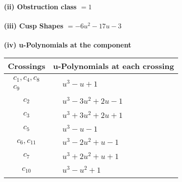 \documentclass[1p]{elsarticle_modified}
\theoremstyle{definition}
\begin{document}
\flushleft \textbf{(ii) Obstruction class $= 1$}\\~\\
\flushleft \textbf{(iii) Cusp Shapes $= -6 u^2-17 u-3$}\\~\\
\newpage\renewcommand{\arraystretch}{1}
\flushleft \textbf{(iv) u-Polynomials at the component}\newline \\
\begin{tabular}{m{50pt}|m{274pt}}
Crossings & \hspace{64pt}u-Polynomials at each crossing \\
\hline $$\begin{aligned}c_{1},c_{4},c_{8}\\c_{9}\end{aligned}$$&$\begin{aligned}
&u^3- u+1
\end{aligned}$\\
\hline $$\begin{aligned}c_{2}\end{aligned}$$&$\begin{aligned}
&u^3-3 u^2+2 u-1
\end{aligned}$\\
\hline $$\begin{aligned}c_{3}\end{aligned}$$&$\begin{aligned}
&u^3+3 u^2+2 u+1
\end{aligned}$\\
\hline $$\begin{aligned}c_{5}\end{aligned}$$&$\begin{aligned}
&u^3- u-1
\end{aligned}$\\
\hline $$\begin{aligned}c_{6},c_{11}\end{aligned}$$&$\begin{aligned}
&u^3-2 u^2+u-1
\end{aligned}$\\
\hline $$\begin{aligned}c_{7}\end{aligned}$$&$\begin{aligned}
&u^3+2 u^2+u+1
\end{aligned}$\\
\hline $$\begin{aligned}c_{10}\end{aligned}$$&$\begin{aligned}
&u^3- u^2+1
\end{aligned}$\\
\hline
\end{tabular}\\~\\
\end{document}
